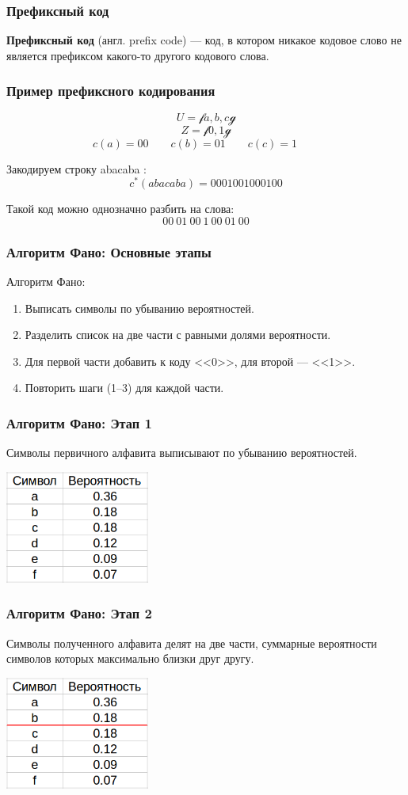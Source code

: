 \documentclass[10pt,pdf,hyperref={unicode}]{beamer}
\begin{document}
\begin{frame}
	\frametitle{Префиксный код}
	\textbf{Префиксный код} (англ. prefix code) --- код, в котором 
	никакое кодовое слово не является префиксом какого-то другого кодового слова.
\end{frame}

\begin{frame}
	\frametitle{Пример префиксного кодирования}
	$$
		U = \mathcal {f} a, b, c \mathcal {g}
	$$$$
		Z = \mathcal {f} 0, 1 \mathcal {g}
	$$$$
		c(a) = 00 \qquad
		c(b) = 01 \qquad
		c(c) = 1 \qquad
	$$

	\vspace{1em}
	Закодируем строку abacaba :
	$$
		c^*(abacaba) = 0001001000100
	$$

	\vspace{1em}
	Такой код можно однозначно разбить на слова:
	$$
		00\ 01\ 00\ 1\ 00\ 01\ 00
	$$
\end{frame}

\begin{frame}
	\frametitle{Алгоритм Фано: Основные этапы}
	Алгоритм Фано:
	\begin{enumerate}
		\item Выписать символы по убыванию вероятностей.
		\item Разделить список на две части с равными долями вероятности.
		\item Для первой части добавить к коду <<0>>, для второй --- <<1>>.
		\item Повторить шаги (1--3) для каждой части.
	\end{enumerate}
\end{frame}


\begin{frame}
	\frametitle{Алгоритм Фано: Этап 1}
	Символы первичного алфавита выписывают по убыванию вероятностей.
	
	\vspace{1em}
	\includegraphics[height=10em]{alg0.png}
\end{frame}

\begin{frame}
	\frametitle{Алгоритм Фано: Этап 2}
	Символы полученного алфавита делят на две части, 
	суммарные вероятности символов которых максимально близки друг другу.
	
	\vspace{1em}
	\includegraphics[height=10em]{alg1.png}
\end{frame}
\end{document}
